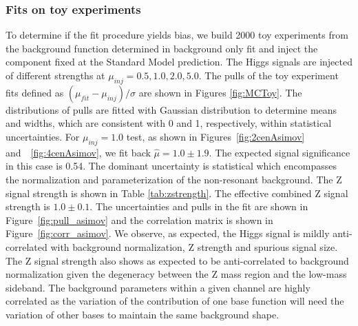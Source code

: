 




\subsubsection{Fits on toy experiments}

To determine if the fit procedure yields bias, we build 2000 toy experiments from the background function determined in background only fit and inject the \zjets{} component fixed at the Standard Model prediction. The Higgs signals are injected of different strengths at $\mu_{inj} = 0.5, 1.0, 2.0, 5.0$. The pulls of the toy experiment fits defined as $(\mu_{fit}-\mu_{inj})/ \sigma$ are shown in Figures \ref{fig:MCToy}. The distributions of pulls are fitted with Gaussian distribution to determine means and widths, which are consistent with 0 and 1, respectively, within statistical uncertainties. For $\mu_{inj}=1.0$ test, as shown in Figures~\ref{fig:2cenAsimov} and~~\ref{fig:4cenAsimov}, we fit back $\hat{\mu}=1.0\pm 1.9$. %
The expected signal significance in this case is 0.54. The dominant uncertainty is statistical which encompasses the normalization and parameterization of the non-resonant background. The Z signal strength is shown in Table \ref{tab:zstrength}. The effective combined Z signal strength is $1.0\pm 0.1$. %
 The uncertainties and pulls in the fit are shown in Figure~\ref{fig:pull_asimov} and the correlation matrix is shown in Figure~\ref{fig:corr_asimov}.  We observe, as expected, the Higgs signal is mildly anti-correlated with background normalization, Z strength and spurious signal size. The Z signal strength also shows as expected to be anti-correlated to background normalization given the degeneracy between the Z mass region and the low-mass sideband. The background parameters within a given channel are highly correlated as the variation of the contribution of one base function will need the variation of other bases to maintain the same background shape. 


